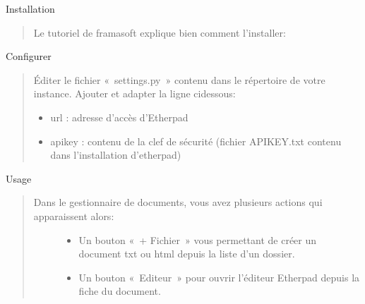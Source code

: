 \documentclass[a4paper,10pt,oneside,french]{sphinxmanual}
\begin{document}
\sphinxAtStartPar
Installation
\begin{quote}

\sphinxAtStartPar
Le tutoriel de framasoft explique bien comment l’installer: 
\end{quote}

\sphinxAtStartPar
Configurer
\begin{quote}

\sphinxAtStartPar
Éditer le fichier « settings.py » contenu dans le répertoire de votre instance.
Ajouter et adapter la ligne ci\sphinxhyphen{}dessous:
\begin{itemize}
\item {} 
\sphinxAtStartPar
url : adresse d’accès d’Etherpad

\item {} 
\sphinxAtStartPar
apikey : contenu de la clef de sécurité (fichier APIKEY.txt contenu dans l’installation d’etherpad)

\end{itemize}
\end{quote}

\begin{sphinxVerbatim}[commandchars=\\\{\}]
     
\end{sphinxVerbatim}

\sphinxAtStartPar
Usage
\begin{quote}
\begin{description}
\item[{Dans le gestionnaire de documents, vous avez plusieurs actions qui apparaissent alors:}] \leavevmode\begin{itemize}
\item {} 
\sphinxAtStartPar
Un bouton « + Fichier » vous permettant de créer un document txt ou html depuis la liste d’un dossier.

\item {} 
\sphinxAtStartPar
Un bouton « Editeur » pour ouvrir l’éditeur Etherpad depuis la fiche du document.

\end{itemize}

\end{description}
\end{quote}
\end{document}
